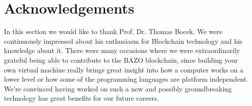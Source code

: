 \chapter*{Acknowledgements}
\thispagestyle{main} %

In this section we would like to thank Prof. Dr. Thomas Bocek. We were continuously impressed about his enthusiasm for Blockchain technology and his knowledge about it. There were many occasions where we were extraordinarily grateful being able to contribute to the BAZO blockchain, since building your own virtual machine really brings great insight into how a computer works on a lower level or how some of the programming languages are platform independent. We're convinced having worked on such a new and possibly groundbreaking technology has great benefits for our future careers.